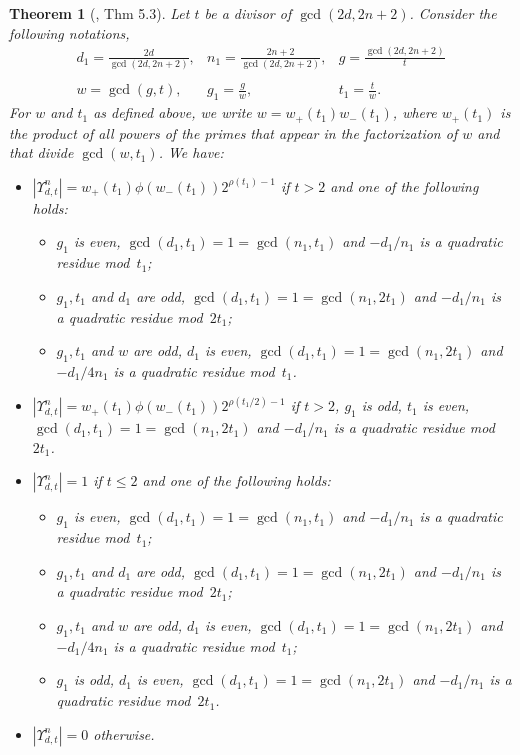 \documentclass{article}
\newtheorem{theorem}[proposition]{Theorem}
\begin{document}
\begin{theorem}[\cite{onorati2022connectedcomponentsmodulispaces}, Thm 5.3]\label{theo_count_connected_components_kumm_type}
Let $t$ be a divisor of $\gcd(2d,2n+2)$. Consider the following notations,
\begin{equation}
\begin{array}{lll}
d_1=\frac{2d}{\gcd(2d,2n+2)}, & n_1=\frac{2n+2}{\gcd(2d,2n+2)}, & g=\frac{\gcd(2d,2n+2)}{t} \\
 & & \\
w=\gcd(g,t), & g_1=\frac{g}{w}, & t_1=\frac{t}{w}.
\end{array}
\end{equation}
For $w$ and $t_1$ as defined above, we write $w=w_+(t_1)w_-(t_1)$, where $w_+(t_1)$ is the product of all powers of the primes that appear in the factorization of $w$ and that divide $\gcd(w,t_1)$. We have:
\begin{itemize}

\item $|\Upsilon_{d,t}^n|=w_+(t_1)\phi(w_-(t_1))2^{\rho(t_1)-1}$ if $t>2$ and one of the following holds:
 \begin{itemize}
 \item $g_1$ is even, $\gcd(d_1,t_1)=1=\gcd(n_1,t_1)$ and $-d_1/n_1$ is a quadratic residue mod~$t_1$;
 \item $g_1,t_1$ and $d_1$ are odd, $\gcd(d_1,t_1)=1=\gcd(n_1,2t_1)$ and $-d_1/n_1$ is a quadratic residue mod~$2t_1$;
 \item $g_1,t_1$ and $w$ are odd, $d_1$ is even, $\gcd(d_1,t_1)=1=\gcd(n_1,2t_1)$ and $-d_1/4n_1$ is a quadratic residue mod~$t_1$.
 \end{itemize}

\item $|\Upsilon_{d,t}^n|=w_+(t_1)\phi(w_-(t_1))2^{\rho(t_1/2)-1}$ if $t>2$, $g_1$ is odd, $t_1$ is even, $\gcd(d_1,t_1)=1=\gcd(n_1,2t_1)$ and $-d_1/n_1$ is a quadratic residue mod~$2t_1$.

\item $|\Upsilon_{d,t}^n|=1$ if $t\leq2$ and one of the following holds:
\begin{itemize}
 \item $g_1$ is even, $\gcd(d_1,t_1)=1=\gcd(n_1,t_1)$ and $-d_1/n_1$ is a quadratic residue mod~$t_1$;
 \item $g_1,t_1$ and $d_1$ are odd, $\gcd(d_1,t_1)=1=\gcd(n_1,2t_1)$ and $-d_1/n_1$ is a quadratic residue mod~$2t_1$;
 \item $g_1,t_1$ and $w$ are odd, $d_1$ is even, $\gcd(d_1,t_1)=1=\gcd(n_1,2t_1)$ and $-d_1/4n_1$ is a quadratic residue mod~$t_1$;
 \item $g_1$ is odd, $d_1$ is even, $\gcd(d_1,t_1)=1=\gcd(n_1,2t_1)$ and $-d_1/n_1$ is a quadratic residue mod~$2t_1$.
 \end{itemize}

\item $|\Upsilon_{d,t}^n|=0$ otherwise.
\end{itemize}
\end{theorem}
\end{document}
